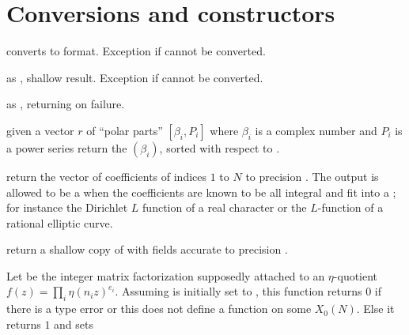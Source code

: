 








\section{Conversions and constructors}

 converts  to  format.
Exception if  cannot be converted.

 as ,
shallow result. Exception if  cannot be converted.

 as
, returning  on failure.

 given a vector $r$ of ``polar parts''
$[\beta_i, P_i]$ where $\beta_i$ is a complex number and $P_i$ is a power
series return the $(\beta_i)$, sorted with respect to .


return the vector of coefficients of indices $1$ to $N$ to precision
. The output is allowed to be a  when the
coefficients are known to be all integral and fit into a ;
for instance the Dirichlet $L$ function of a real character or the
$L$-function of a rational elliptic curve.

return a shallow copy of  with fields accurate to precision
.

 Let  be the integer matrix factorization supposedly
attached to an $\eta$-quotient $f(z) = \prod_i \eta(n_i z)^{e_i}$. Assuming
 is initially set to , this function returns $0$ if
there is a type error or this does not define a function on some $X_0(N)$.
Else it returns $1$ and sets

